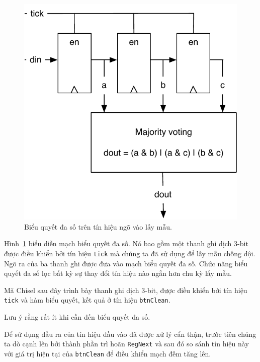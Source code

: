 \documentclass[%
    10pt,
    headinclude, footexclude,
    openright, %
    notitlepage,
    cleardoubleempty,
    headsepline,
    pointlessnumbers,
    bibtotoc, idxtotoc,
    ]{scrbook}
\newcommand{\code}[1]{{\small{\texttt{#1}}}}
\newcommand{\scale}{0.7}
\begin{document}
\begin{figure}
  \centering
  \includegraphics[scale=\scale]{figures/majority}
  \caption{Biểu quyết đa số trên tín hiệu ngõ vào lấy mẫu.}
  \label{fig:majority}
\end{figure}

Hình~\ref{fig:majority} biểu diễn mạch biểu quyết đa số. Nó bao gồm một thanh ghi dịch 3-bit được điều khiển bởi tín hiệu \code{tick} mà chúng ta đã sử dụng để lấy mẫu chống dội. Ngõ ra của ba thanh ghi được đưa vào mạch biểu quyết đa số. Chức năng biểu quyết đa số lọc bất kỳ sự thay đổi tín hiệu nào ngắn hơn chu kỳ lấy mẫu.

Mã Chisel sau đây trình bày thanh ghi dịch 3-bit, được điều khiển bởi tín hiệu \code{tick} và hàm biểu quyết, kết quả ở tín hiệu \code{btnClean}.

Lưu ý rằng rất ít khi cần đến biểu quyết đa số. 


Để sử dụng đầu ra của tín hiệu đầu vào đã được xử lý cẩn thận, trước tiên chúng ta dò cạnh lên bởi thành phần trì hoãn \code{RegNext} và sau đó so sánh tín hiệu này với giá trị hiện tại của \code{btnClean} để điều khiển mạch đếm tăng lên. 


\end{document}

